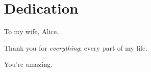 \chapter{Dedication}
\label{ch:dedication}

To my wife, Alice. 

\noindent Thank you for \emph{everything}; every part of my life. 

\noindent You're amazing. 